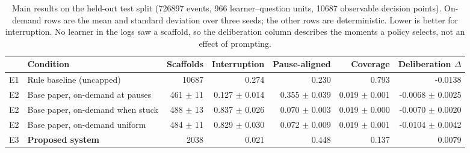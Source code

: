 \begin{table}[t]
\centering
\caption{Main results on the held-out test split (726897 events, 966 learner--question units,
10687 observable decision points). On-demand rows are the mean and standard deviation over
three seeds; the other rows are deterministic. Lower is better for interruption.
No learner in the logs saw a scaffold, so the deliberation column describes the moments a
policy selects, not an effect of prompting.}
\label{tab:main}
\begin{tabular}{llrrrrr}
\toprule
 & Condition & Scaffolds & Interruption & Pause-aligned & Coverage & Deliberation $\Delta$ \\
\midrule
E1 & Rule baseline (uncapped) & 10687 & 0.274 & 0.230 & 0.793 & -0.0138 \\
E2 & Base paper, on-demand at pauses & 461 $\pm$ 11 & 0.127 $\pm$ 0.014 & 0.355 $\pm$ 0.039 & 0.019 $\pm$ 0.001 & -0.0068 $\pm$ 0.0025 \\
E2 & Base paper, on-demand when stuck & 488 $\pm$ 13 & 0.837 $\pm$ 0.026 & 0.070 $\pm$ 0.003 & 0.019 $\pm$ 0.000 & -0.0070 $\pm$ 0.0020 \\
E2 & Base paper, on-demand uniform & 484 $\pm$ 11 & 0.829 $\pm$ 0.030 & 0.072 $\pm$ 0.009 & 0.019 $\pm$ 0.001 & -0.0104 $\pm$ 0.0042 \\
E3 & \textbf{Proposed system} & 2038 & 0.021 & 0.448 & 0.137 & 0.0079 \\
\bottomrule
\end{tabular}
\end{table}
